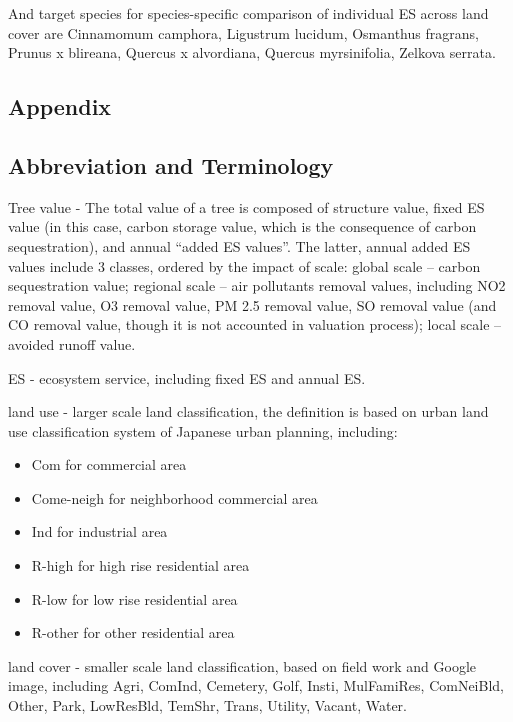\documentclass[
]{article}
\begin{document}
And target species for species-specific comparison of individual ES across land cover are Cinnamomum camphora, Ligustrum lucidum, Osmanthus fragrans, Prunus x blireana, Quercus x alvordiana, Quercus myrsinifolia, Zelkova serrata.

\hypertarget{appendix}{%
\subsection{Appendix}\label{appendix}}

\hypertarget{abbreviation-and-terminology}{%
\subsection{Abbreviation and Terminology}\label{abbreviation-and-terminology}}

Tree value - The total value of a tree is composed of structure value, fixed ES value (in this case, carbon storage value, which is the consequence of carbon sequestration), and annual ``added ES values''. The latter, annual added ES values include 3 classes, ordered by the impact of scale: global scale -- carbon sequestration value; regional scale -- air pollutants removal values, including NO2 removal value, O3 removal value, PM 2.5 removal value, SO removal value (and CO removal value, though it is not accounted in valuation process); local scale -- avoided runoff value.

ES - ecosystem service, including fixed ES and annual ES.

land use - larger scale land classification, the definition is based on urban land use classification system of Japanese urban planning, including:

\begin{itemize}
\item
  Com for commercial area
\item
  Come-neigh for neighborhood commercial area
\item
  Ind for industrial area
\item
  R-high for high rise residential area
\item
  R-low for low rise residential area
\item
  R-other for other residential area
\end{itemize}

land cover - smaller scale land classification, based on field work and Google image, including Agri, ComInd, Cemetery, Golf, Insti, MulFamiRes, ComNeiBld, Other, Park, LowResBld, TemShr, Trans, Utility, Vacant, Water.
\end{document}
